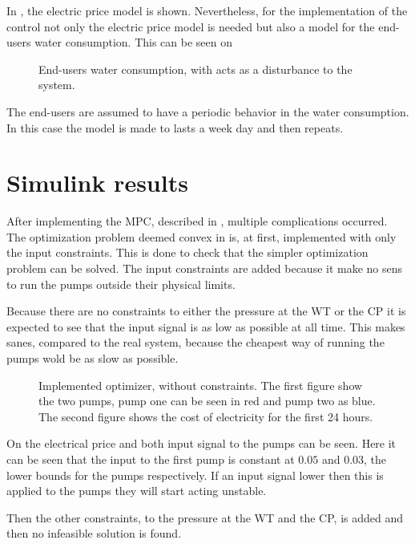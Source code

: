 In , the electric price model is shown. Nevertheless, for the implementation of the control not only the electric price model is needed but also a model for the end-users water consumption. This can be seen on 

\begin{figure}[H]
\centering
 
\caption{End-users water consumption, with acts as a disturbance to the system.}
\label{fig:water_consumption}
\end{figure}

The end-users are assumed to have a periodic behavior in the water consumption. In this case the model is made to lasts a week day and then repeats. 


\section{Simulink results}

After implementing the MPC, described in , multiple complications occurred. The optimization problem deemed convex in  is, at first, implemented with only the input constraints. This is done to check that the simpler optimization problem can be solved. The input constraints are added because it make no sens to run the pumps outside their physical limits. 

Because there are no constraints to either the pressure at the WT or the CP it is expected to see that the input signal is as low as possible at all time. This makes sanes, compared to the real system, because the cheapest way of running the pumps wold be as slow as possible. 

\begin{figure}[H]
\centering
 
\caption{Implemented optimizer, without constraints. The first figure show the two pumps, pump one can be seen in red and pump two as blue. The second figure shows the cost of electricity for the first 24 hours.}
\label{fig:Implementation_shit}
\end{figure}

On  the electrical price and both input signal to the pumps can be seen. Here it can be seen that the input to the first pump is constant at $0.05$ and $0.03$, the lower bounds for the pumps respectively. If an input signal lower then this is applied to the pumps they will start acting unstable. 

Then the other constraints, to the pressure at the WT and the CP, is added and then no infeasible solution is found.   





%
%
%
%
%
